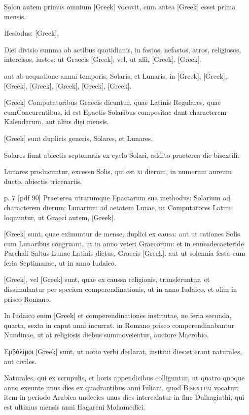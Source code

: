 Solon autem
primus omnium \textgreek{[Greek]} vocavit, cum antea \textgreek{[Greek]} esset
prima mensis.

Hesiodus: \textgreek{[Greek]}.

Diei divisio summa ab actibus quotidianis, in fastos, nefastos, atros,
religiosos, intercisos, iustos: ut Graecis \textgreek{[Greek]}, vel, ut alii,
\textgreek{[Greek]}, \textgreek{[Greek]}.

aut ab aequatione annui
temporis, Solaris, et Lunaris, in \textgreek{[Greek]}, \textgreek{[Greek]},
\textgreek{[Greek]}, \textgreek{[Greek]}, \textgreek{[Greek]},
\textgreek{[Greek]}, \textgreek{[Greek]}.

\textgreek{[Greek]} Computatoribus
Graecis dicuntur, quae Latinis Regulares, quae cumConcurentibus,
id est Epactis Solaribus compositae dant characterem Kalendarum,
aut alius diei mensis.

\textgreek{[Greek]} sunt duplicis generis, Solares, et
Lunares.

Solares fiunt abiectis septenariis ex cyclo Solari, addito praeterea
die bisextili.

Lunares producuntur, excessu Solis, qui est \textsc{xi} dierum,
in numerum aureum ducto, abiectis tricenariis.

p. 7 [pdf 90]
%
Praeterea utrarumque
Epactarum sua methodus: Solarium ad characterem dierum:
Lunarium ad aetatem Lunae, ut Computatores Latini loquuntur, ut
Graeci autem, \textgreek{[Greek]}.

\textgreek{[Greek]} sunt, quae eximuntur de
mense, duplici ex causa: aut ut rationes Solis cum Lunaribus congruant,
ut in anno veteri Graecorum: et in enneadecaeteride Paschali
Saltus Lunae Latinis dictus, Graecis \textgreek{[Greek]}. aut ut solennia
festa cum feria Septimanae, ut in anno Iudaico.

\textgreek{[Greek]}, vel \textgreek{[Greek]}
sunt, quae ex caussa religionis, transferuntur, et dissimulantur per speciem
comperendinationis, ut in anno Iudaico, et olim in prisco Romano.

In Iudaico enim \textgreek{[Greek]} et comperendinationes institutae, ne
feria secunda, quarta, sexta in caput anni incurrat. in Romano prisco
comperendinabantur Nundinae, ut at religiosis diebus summoveientur,
auctore Macrobio.

\textgreek{Εμβόλίμοι [Greek]} sunt, ut notio verbi declarat, insititii
dies:et erant naturales, aut civiles.

Naturales, qui ex scrupulis, et
horis appendicibus colliguntur, ut quatro quoque anno exeunte unus
dies ex quadrantibus anni Iuliani, quod \textsc{Bisextum} vocatur: item
in periodo Arabica undecies unus dies intercalatur in fine Dulhagiathi,
qui est ultimus mensis anni Hagareni Mohamedici.

